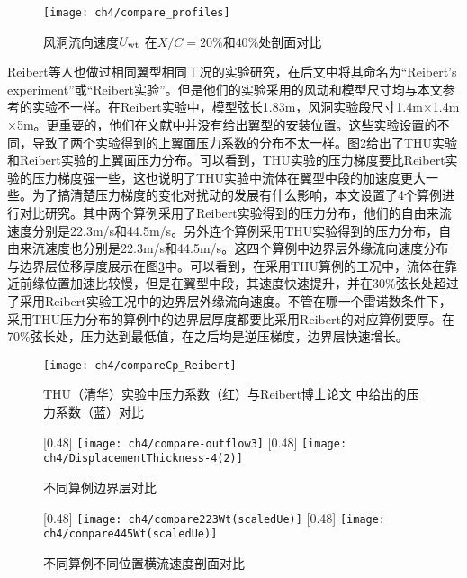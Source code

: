 \begin{figure}
\centering
  \texttt{[image: ch4/compare\_profiles]}
\caption{风洞流向速度$U_{\rm{wt}}$ 在$X/C= 20\%$和$40\%$处剖面对比}
\label{f:compare_profiles}
\end{figure}
Reibert等人\cite{Reiberit1996}也做过相同翼型相同工况的实验研究，在后文中将其命名为``Reibert's experiment''或``Reibert实验''。但是他们的实验采用的风动和模型尺寸均与本文参考的实验不一样。在Reibert实验中，模型弦长1.83m，风洞实验段尺寸1.4m$\times$1.4m$\times$5m。更重要的，他们在文献中并没有给出翼型的安装位置。这些实验设置的不同，导致了两个实验得到的上翼面压力系数的分布不太一样。图\ref{f:CpCompare}给出了THU实验和Reibert实验的上翼面压力分布。可以看到，THU实验的压力梯度要比Reibert实验的压力梯度强一些，这也说明了THU实验中流体在翼型中段的加速度更大一些。为了搞清楚压力梯度的变化对扰动的发展有什么影响，本文设置了4个算例进行对比研究。其中两个算例采用了Reibert实验得到的压力分布，他们的自由来流速度分别是22.3m/s和44.5m/s。另外连个算例采用THU实验得到的压力分布，自由来流速度也分别是22.3m/s和44.5m/s。这四个算例中边界层外缘流向速度分布与边界层位移厚度展示在图\ref{fig:CompOutFlow}中。可以看到，在采用THU算例的工况中，流体在靠近前缘位置加速比较慢，但是在翼型中段，其速度快速提升，并在30\%弦长处超过了采用Reibert实验工况中的边界层外缘流向速度。不管在哪一个雷诺数条件下，采用THU压力分布的算例中的边界层厚度都要比采用Reibert的对应算例要厚。在70\%弦长处，压力达到最低值，在之后均是逆压梯度，边界层快速增长。
\begin{figure}[htb]
\centering
  \texttt{[image: ch4/compareCp\_Reibert]}
  \caption{THU（清华）实验中压力系数（红）与Reibert博士论文 \cite{Reiberit1996}中给出的压力系数（蓝）对比}\label{f:CpCompare}
\end{figure}
\begin{figure}[htb]
\centering
{}[0.48\linewidth] %
    {\texttt{[image: ch4/compare-outflow3]}}
[0.48\linewidth]%
    {\texttt{[image: ch4/DisplacementThickness-4(2)]}}
\caption{不同算例边界层对比}
\label{fig:CompOutFlow} %
\end{figure}
\begin{figure}[htb]
\centering
{}[0.48\linewidth]%
{\texttt{[image: ch4/compare223Wt(scaledUe)]}}
 [0.48\linewidth]%
{\texttt{[image: ch4/compare445Wt(scaledUe)]}}
\caption{不同算例不同位置横流速度剖面对比}
\label{fig:CompCrossProfiles} %
\end{figure}

